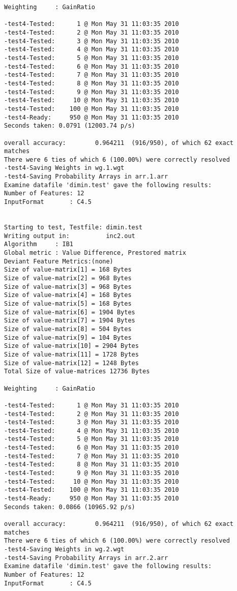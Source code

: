 \documentclass{report}
\begin{document}
\begin{footnotesize}
\begin{verbatim}
Weighting     : GainRatio

-test4-Tested:      1 @ Mon May 31 11:03:35 2010
-test4-Tested:      2 @ Mon May 31 11:03:35 2010
-test4-Tested:      3 @ Mon May 31 11:03:35 2010
-test4-Tested:      4 @ Mon May 31 11:03:35 2010
-test4-Tested:      5 @ Mon May 31 11:03:35 2010
-test4-Tested:      6 @ Mon May 31 11:03:35 2010
-test4-Tested:      7 @ Mon May 31 11:03:35 2010
-test4-Tested:      8 @ Mon May 31 11:03:35 2010
-test4-Tested:      9 @ Mon May 31 11:03:35 2010
-test4-Tested:     10 @ Mon May 31 11:03:35 2010
-test4-Tested:    100 @ Mon May 31 11:03:35 2010
-test4-Ready:     950 @ Mon May 31 11:03:35 2010
Seconds taken: 0.0791 (12003.74 p/s)

overall accuracy:        0.964211  (916/950), of which 62 exact matches 
There were 6 ties of which 6 (100.00%) were correctly resolved
-test4-Saving Weights in wg.1.wgt
-test4-Saving Probability Arrays in arr.1.arr
Examine datafile 'dimin.test' gave the following results:
Number of Features: 12
InputFormat       : C4.5


Starting to test, Testfile: dimin.test
Writing output in:          inc2.out
Algorithm     : IB1
Global metric : Value Difference, Prestored matrix
Deviant Feature Metrics:(none)
Size of value-matrix[1] = 168 Bytes 
Size of value-matrix[2] = 968 Bytes 
Size of value-matrix[3] = 968 Bytes 
Size of value-matrix[4] = 168 Bytes 
Size of value-matrix[5] = 168 Bytes 
Size of value-matrix[6] = 1904 Bytes 
Size of value-matrix[7] = 1904 Bytes 
Size of value-matrix[8] = 504 Bytes 
Size of value-matrix[9] = 104 Bytes 
Size of value-matrix[10] = 2904 Bytes 
Size of value-matrix[11] = 1728 Bytes 
Size of value-matrix[12] = 1248 Bytes 
Total Size of value-matrices 12736 Bytes 

Weighting     : GainRatio

-test4-Tested:      1 @ Mon May 31 11:03:35 2010
-test4-Tested:      2 @ Mon May 31 11:03:35 2010
-test4-Tested:      3 @ Mon May 31 11:03:35 2010
-test4-Tested:      4 @ Mon May 31 11:03:35 2010
-test4-Tested:      5 @ Mon May 31 11:03:35 2010
-test4-Tested:      6 @ Mon May 31 11:03:35 2010
-test4-Tested:      7 @ Mon May 31 11:03:35 2010
-test4-Tested:      8 @ Mon May 31 11:03:35 2010
-test4-Tested:      9 @ Mon May 31 11:03:35 2010
-test4-Tested:     10 @ Mon May 31 11:03:35 2010
-test4-Tested:    100 @ Mon May 31 11:03:35 2010
-test4-Ready:     950 @ Mon May 31 11:03:35 2010
Seconds taken: 0.0866 (10965.92 p/s)

overall accuracy:        0.964211  (916/950), of which 62 exact matches 
There were 6 ties of which 6 (100.00%) were correctly resolved
-test4-Saving Weights in wg.2.wgt
-test4-Saving Probability Arrays in arr.2.arr
Examine datafile 'dimin.test' gave the following results:
Number of Features: 12
InputFormat       : C4.5



\end{verbatim}
\end{footnotesize}
\end{document}
